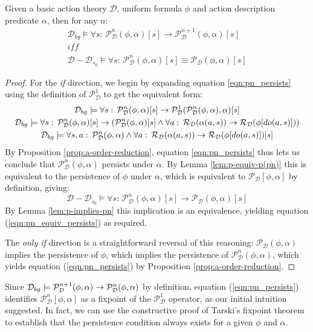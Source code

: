 \begin{thm}
Given a basic action theory $\mathcal{D}$, uniform formula $\phi$
and action description predicate $\alpha$, then for any $n$:\label{thm:p(pn)-equiv-p}\begin{gather}
\mathcal{D}_{bg}\models\forall s:\,\mathcal{P}_{\mathcal{D}}^{n}(\phi,\alpha)[s]\rightarrow\mathcal{P}_{\mathcal{D}}^{n+1}(\phi,\alpha)[s]\label{eqn:pn_persists}\\
\mathit{iff}\nonumber \\
\mathcal{D}-\mathcal{D}_{s_{0}}\models\forall s:\,\mathcal{P}_{\mathcal{D}}^{n}(\phi,\alpha)[s]\equiv\mathcal{P_{D}}(\phi,\alpha)[s]\label{eqn:pn_equiv_persists}\end{gather}

\end{thm}
\begin{proof}
For the \emph{if} direction, we begin by expanding equation \eqref{eqn:pn_persists}
using the definition of $\mathcal{P}_{\mathcal{D}}^{1}$ to get the
equivalent form:\begin{gather*}
\mathcal{D}_{bg}\models\forall s:\,\mathcal{P}_{\mathcal{D}}^{n}(\phi,\alpha)[s]\rightarrow\mathcal{P}_{\mathcal{D}}^{1}(\mathcal{P}_{\mathcal{D}}^{n}(\phi,\alpha),\alpha)[s]\\
\mathcal{D}_{bg}\models\forall s:\,\mathcal{P}_{\mathcal{D}}^{n}(\phi,\alpha)[s]\rightarrow\left(\mathcal{P}_{\mathcal{D}}^{n}(\phi,\alpha)[s]\wedge\forall a:\,\mathcal{R}_{\mathcal{D}}(\alpha(a,s))\rightarrow\mathcal{R}_{\mathcal{D}}(\phi[do(a,s)])\right)\\
\mathcal{D}_{bg}\models\forall s,a:\,\mathcal{P}_{\mathcal{D}}^{n}(\phi,\alpha)\wedge\forall a:\,\mathcal{R}_{\mathcal{D}}(\alpha(a,s))\rightarrow\mathcal{R}_{\mathcal{D}}(\phi[do(a,s)])[s]\end{gather*}
 By Proposition \ref{prop:a-order-reduction}, equation \eqref{eqn:pn_persists}
thus lets us conclude that $\mathcal{P}_{\mathcal{D}}^{n}(\phi,\alpha)$
persists under $\alpha$. By Lemma \ref{lem:p-equiv-p(pn)} this is
equivalent to the persistence of $\phi$ under $\alpha$, which is
equivalent to $\mathcal{P_{D}}[\phi,\alpha]$ by definition, giving:\[
\mathcal{D}-\mathcal{D}_{s_{0}}\models\forall s:\,\mathcal{P}_{\mathcal{D}}^{n}(\phi,\alpha)[s]\rightarrow\mathcal{P_{D}}(\phi,\alpha)[s]\]
 By Lemma \ref{lem:p-implies-pn} this implication is an equivalence,
yielding equation (\ref{eqn:pn_equiv_persists}) as required.

The \emph{only if} direction is a straightforward reversal of this
reasoning: $\mathcal{P_{D}}(\phi,\alpha)$ implies the persistence
of $\phi$, which implies the persistence of $\mathcal{P}_{\mathcal{D}}^{n}(\phi,\alpha)$,
which yields equation (\ref{eqn:pn_persists}) by Proposition \ref{prop:a-order-reduction}. 
\end{proof}
Since $\mathcal{D}_{bg}\models\mathcal{P}_{\mathcal{D}}^{n+1}(\phi,\alpha)\rightarrow\mathcal{P}_{\mathcal{D}}^{n}(\phi,\alpha)$
by definition, equation (\ref{eqn:pn_persists}) identifies $\mathcal{P}_{\mathcal{D}}^{n}[\phi,\alpha]$
as a fixpoint of the $\mathcal{P}_{\mathcal{D}}^{1}$ operator, as
our initial intuition suggested. In fact, we can use the constructive
proof of Tarski's fixpoint theorem \citep{cousot79constructive_tarski}
to establish that the persistence condition always exists for a given
$\phi$ and $\alpha$.

